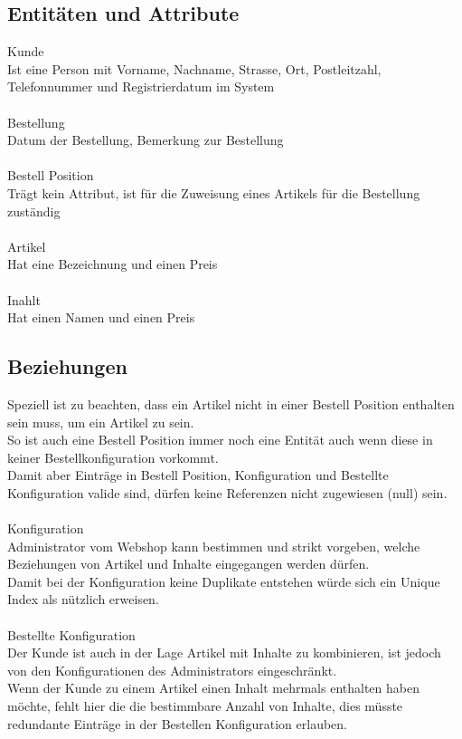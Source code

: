 \documentclass{article}
\begin{document}
\subsection{Entitäten und Attribute}
{\large Kunde}\\
Ist eine Person mit Vorname, Nachname, Strasse, Ort, Postleitzahl, Telefonnummer und Registrierdatum im System\\
\\
{\large Bestellung}\\
Datum der Bestellung, Bemerkung zur Bestellung\\
\\
{\large Bestell Position}\\
Trägt kein Attribut, ist für die Zuweisung eines Artikels für die Bestellung zuständig\\
\\
{\large Artikel}\\
Hat eine Bezeichnung und einen Preis\\
\\
{\large Inahlt}\\
Hat einen Namen und einen Preis 
\subsection{Beziehungen}
Speziell ist zu beachten, dass ein Artikel nicht in einer Bestell Position enthalten sein muss, um ein Artikel zu sein.\\
So ist auch eine Bestell Position immer noch eine Entität auch wenn diese in keiner Bestellkonfiguration vorkommt.\\
Damit aber Einträge in Bestell Position, Konfiguration und Bestellte Konfiguration valide sind, dürfen keine Referenzen nicht zugewiesen (null) sein.\\
\\
{\large Konfiguration}\\
Administrator vom Webshop kann bestimmen und strikt vorgeben, welche Beziehungen von Artikel und Inhalte eingegangen werden dürfen.\\
Damit bei der Konfiguration keine Duplikate entstehen würde sich ein Unique Index als nützlich erweisen.\\ 
\\
{\large Bestellte Konfiguration}\\
Der Kunde ist auch in der Lage Artikel mit Inhalte zu kombinieren, ist jedoch von den Konfigurationen des Administrators eingeschränkt.\\
Wenn der Kunde zu einem Artikel einen Inhalt mehrmals enthalten haben möchte, fehlt hier die die bestimmbare Anzahl von Inhalte, dies müsste redundante Einträge in der Bestellen Konfiguration erlauben.\\
\end{document}
